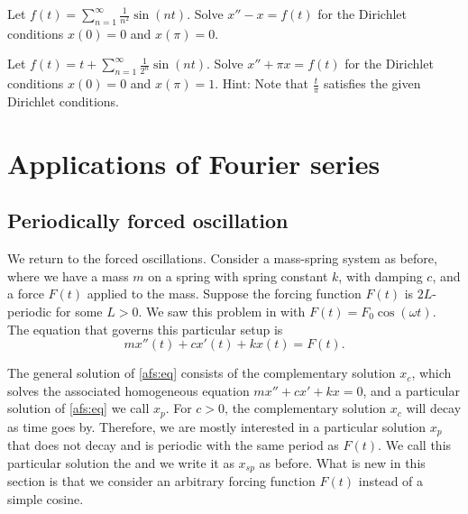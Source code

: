 \begin{exercise}
Let $f(t) = \sum_{n=1}^\infty \frac{1}{n^2} \sin(nt)$.  Solve
$x''- x = f(t)$ for the Dirichlet conditions $x(0) = 0$
and $x(\pi) = 0$.
\end{exercise}

\begin{exercise}[challenging]
Let $f(t) = t + \sum_{n=1}^\infty \frac{1}{2^n} \sin(nt)$.  Solve
$x'' + \pi x = f(t)$ for the Dirichlet conditions $x(0) = 0$
and $x(\pi) = 1$.  Hint:  Note that $\frac{t}{\pi}$ satisfies the
given Dirichlet conditions.
\end{exercise}



\sectionnewpage
\section{Applications of Fourier series}
\label{appoffourier:section}



\subsection{Periodically forced oscillation}

\begin{mywrapfigsimp}{2.0in}{2.3in}
\noindent
{}
\end{mywrapfigsimp}
We return to the forced oscillations.  Consider a mass-spring system as
before, where we have a mass $m$
on a spring with spring constant $k$,
with damping $c$, and a force $F(t)$ applied to the mass.  Suppose 
the forcing function $F(t)$ is $2L$-periodic for some $L > 0$.
We saw
this problem in  with $F(t) = F_0 \cos (\omega t)$.  The
equation that governs this particular setup is
\begin{equation} \label{afs:eq}
mx''(t) + cx'(t) + kx(t) = F(t) .
\end{equation}

The general solution of \eqref{afs:eq} consists of the complementary solution $x_c$, which
solves the associated homogeneous equation $mx'' + cx' + kx = 0$, and
a particular solution of \eqref{afs:eq} we call $x_p$.  For $c > 0$,
the complementary solution $x_c$ will decay as time goes by.
Therefore,
we are mostly interested
in a particular solution $x_p$ that does not decay
and is periodic with the same period as $F(t)$.  We call this particular
solution
the \emph{} and we write it as $x_{sp}$ as before.
What is new in this section is that we consider an arbitrary
forcing function $F(t)$ instead of a simple cosine.


